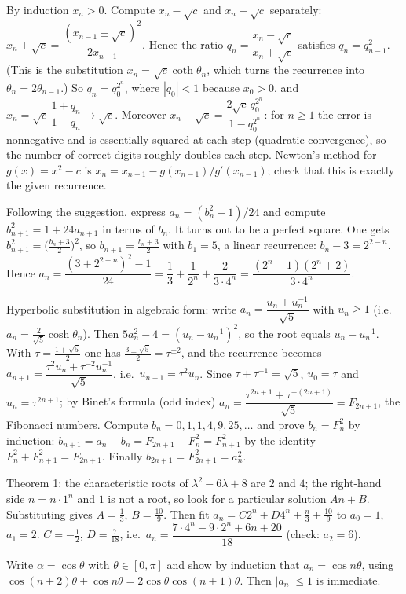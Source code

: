 \documentclass[11pt,a4paper]{article}
\begin{document}

 By induction $x_n>0$. Compute $x_n-\sqrt c$ and $x_n+\sqrt c$ separately: $x_n\pm\sqrt c=\dfrac{(x_{n-1}\pm\sqrt c)^2}{2x_{n-1}}$. Hence the ratio $q_n=\dfrac{x_n-\sqrt c}{x_n+\sqrt c}$ satisfies $q_n=q_{n-1}^2$. (This is the substitution $x_n=\sqrt c\coth\theta_n$, which turns the recurrence into $\theta_n=2\theta_{n-1}$.)
 So $q_n=q_0^{2^n}$, where $|q_0|<1$ because $x_0>0$, and $x_n=\sqrt c\,\dfrac{1+q_n}{1-q_n}\to\sqrt c$. Moreover $x_n-\sqrt c=\dfrac{2\sqrt c\,q_0^{2^n}}{1-q_0^{2^n}}$: for $n\ge1$ the error is nonnegative and is essentially squared at each step (quadratic convergence), so the number of correct digits roughly doubles each step.
 Newton's method for $g(x)=x^2-c$ is $x_n=x_{n-1}-g(x_{n-1})/g'(x_{n-1})$; check that this is exactly the given recurrence.

 Following the suggestion, express $a_n=(b_n^2-1)/24$ and compute $b_{n+1}^2=1+24a_{n+1}$ in terms of $b_n$. It turns out to be a perfect square.
 One gets $b_{n+1}^2=\bigl(\frac{b_n+3}{2}\bigr)^2$, so $b_{n+1}=\frac{b_n+3}{2}$ with $b_1=5$, a linear recurrence: $b_n-3=2^{2-n}$.
 Hence $a_n=\dfrac{(3+2^{2-n})^2-1}{24}=\dfrac13+\dfrac1{2^n}+\dfrac{2}{3\cdot4^n}=\dfrac{(2^n+1)(2^n+2)}{3\cdot 4^n}$.

 Hyperbolic substitution in algebraic form: write $a_n=\dfrac{u_n+u_n^{-1}}{\sqrt5}$ with $u_n\ge1$ (i.e.\ $a_n=\frac2{\sqrt5}\cosh\theta_n$). Then $5a_n^2-4=(u_n-u_n^{-1})^2$, so the root equals $u_n-u_n^{-1}$.
 With $\tau=\frac{1+\sqrt5}2$ one has $\frac{3\pm\sqrt5}2=\tau^{\pm2}$, and the recurrence becomes $a_{n+1}=\dfrac{\tau^2u_n+\tau^{-2}u_n^{-1}}{\sqrt5}$, i.e.\ $u_{n+1}=\tau^2u_n$. Since $\tau+\tau^{-1}=\sqrt5$, $u_0=\tau$ and $u_n=\tau^{2n+1}$; by Binet's formula (odd index) $a_n=\dfrac{\tau^{2n+1}+\tau^{-(2n+1)}}{\sqrt5}=F_{2n+1}$, the Fibonacci numbers.
 Compute $b_n=0,1,1,4,9,25,\dots$ and prove $b_n=F_n^2$ by induction: $b_{n+1}=a_n-b_n=F_{2n+1}-F_n^2=F_{n+1}^2$ by the identity $F_n^2+F_{n+1}^2=F_{2n+1}$. Finally $b_{2n+1}=F_{2n+1}^2=a_n^2$.

 Theorem 1: the characteristic roots of $\lambda^2-6\lambda+8$ are $2$ and $4$; the right-hand side $n=n\cdot1^n$ and $1$ is not a root, so look for a particular solution $An+B$.
 Substituting gives $A=\frac13$, $B=\frac{10}{9}$. Then fit $a_n=C2^n+D4^n+\frac n3+\frac{10}9$ to $a_0=1$, $a_1=2$.
 $C=-\frac12$, $D=\frac7{18}$, i.e.\ $a_n=\dfrac{7\cdot4^n-9\cdot2^n+6n+20}{18}$ (check: $a_2=6$).

 Write $\alpha=\cos\theta$ with $\theta\in[0,\pi]$ and show by induction that $a_n=\cos n\theta$, using $\cos(n+2)\theta+\cos n\theta=2\cos\theta\cos(n+1)\theta$. Then $|a_n|\le1$ is immediate.
\end{document}
